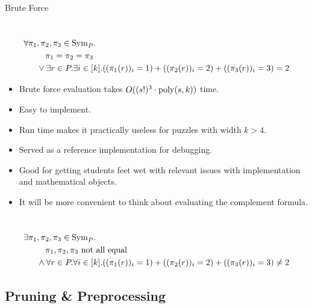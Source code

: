 \documentclass[t,10pt,
mathserif,xcolor=dvipsnames]{beamer}
\begin{document}
\begin{myframe}{Brute Force}

  ~\\[-7ex]
  \begin{equation*}
    \begin{aligned}
      \forall \pi_1&,\pi_2, \pi_3 \in \mathrm{Sym}_{P}.\\
      &~~~\pi_1 = \pi_2 = \pi_3\\
      &\vee \exists r \in P. \exists i \in [k]. ((\pi_1(r))_i = 1) + ((\pi_2(r))_i = 2) + ((\pi_3(r))_i = 3) = 2
    \end{aligned}
  \end{equation*}
  
  \begin{itemize}
  \item Brute force evaluation takes $O((s!)^3\cdot\mathrm{poly}(s,k))$ time.
  \item Easy to implement.
  \item Run time makes it practically useless for puzzles with width $k > 4$.
  \item Served as a reference implementation for debugging.
  \item Good for getting students feet wet with relevant issues with
    implementation and mathematical objects.
  \item It will be more convenient to think about evaluating the complement formula.
  \end{itemize}

  ~\\[-5ex]
  \begin{equation*}
    \begin{aligned}
      \exists \pi_1&,\pi_2, \pi_3 \in \mathrm{Sym}_{P}.\\
      &~~~\pi_1, \pi_2, \pi_3 \text{ not all equal}\\
      &\wedge \forall r \in P. \forall i \in [k]. ((\pi_1(r))_i = 1) + ((\pi_2(r))_i = 2) + ((\pi_3(r))_i = 3) \neq 2
    \end{aligned}
  \end{equation*}
  
\end{myframe}

\subsection{Pruning \& Preprocessing}
\end{document}
